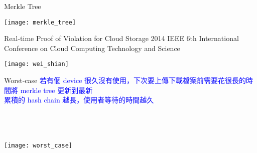 \begin{frame}{Merkle Tree}
	\begin{center}
		\texttt{[image: merkle\_tree]}
	\end{center}
\end{frame}

\begin{frame}{Real-time Proof of Violation for Cloud Storage}
{2014 IEEE 6th International Conference on Cloud Computing Technology and Science}
	\begin{center}
		\texttt{[image: wei\_shian]}
	\end{center}
\end{frame}

\begin{frame}{Worst-case}
	\textcolor{blue}{若有個 device 很久沒有使用，下次要上傳下載檔案前需要花很長的時間將 merkle tree 更新到最新\\
	累積的 hash chain 越長，使用者等待的時間越久}\\
	~\\
	~\\
	~\\
	\begin{center}
		\texttt{[image: worst\_case]}
	\end{center}
\end{frame}